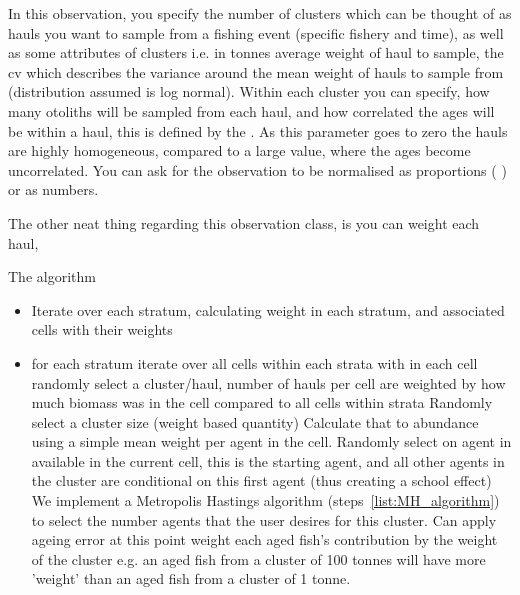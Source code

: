 In this observation, you specify the number of clusters which can be thought of as hauls you want to sample from a fishing event (specific fishery and time), as well as some attributes of clusters i.e.   in tonnes average weight of haul to sample, the cv  which describes the variance around the mean weight of hauls to sample from (distribution assumed is log normal). Within each cluster you can specify, how many otoliths will be sampled from each haul, and how correlated the ages will be within a haul, this is defined by the . As this parameter goes to zero the hauls are highly homogeneous, compared to a large value, where the ages become uncorrelated. You can ask for the observation to be normalised as proportions ( ) or as numbers. 



The other neat thing regarding this observation class, is you can weight each haul, 




The algorithm

\begin{itemize}
	\item Iterate over each stratum, calculating weight in each stratum, and associated cells with their weights
	\item for each stratum
	\subitem iterate over all cells within each strata 
	\subitem with in each cell
	\subsubitem randomly select a cluster/haul, number of hauls per cell are weighted by how much biomass was in the cell compared to all cells within strata
	\subsubitem Randomly select a cluster size (weight based quantity)
	\subsubitem Calculate that to abundance using a simple mean weight per agent in the cell.
	\subsubitem Randomly select on agent in available in the current cell, this is the starting agent, and all other agents in the cluster are conditional on this first agent (thus creating a school effect)
	\subsubitem We implement a Metropolis Hastings algorithm (steps~\ref{list:MH_algorithm}) to select the number agents that the user desires for this cluster.
	\subsubitem Can apply ageing error at this point
	\subsubitem weight each aged fish's contribution by the weight of the cluster e.g. an aged fish from a cluster of 100 tonnes will have more 'weight' than an aged fish from a cluster of 1 tonne.
\end{itemize}
%

